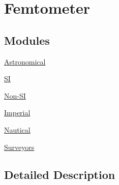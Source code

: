 \hypertarget{group___e_g_x_math-_conversions-_length_conversions-_s_i-_femtometer}{}\section{Femtometer}
\label{group___e_g_x_math-_conversions-_length_conversions-_s_i-_femtometer}
\subsection*{Modules}
\begin{DoxyCompactItemize}
\item 
\mbox{\hyperlink{group___e_g_x_math-_conversions-_length_conversions-_s_i-_femtometer-_astronomical}{Astronomical}}
\item 
\mbox{\hyperlink{group___e_g_x_math-_conversions-_length_conversions-_s_i-_femtometer-_s_i}{SI}}
\item 
\mbox{\hyperlink{group___e_g_x_math-_conversions-_length_conversions-_s_i-_femtometer-_non-_s_i}{Non-\/\+SI}}
\item 
\mbox{\hyperlink{group___e_g_x_math-_conversions-_length_conversions-_s_i-_femtometer-_imperial}{Imperial}}
\item 
\mbox{\hyperlink{group___e_g_x_math-_conversions-_length_conversions-_s_i-_femtometer-_nautical}{Nautical}}
\item 
\mbox{\hyperlink{group___e_g_x_math-_conversions-_length_conversions-_s_i-_femtometer-_surveyors}{Surveyors}}
\end{DoxyCompactItemize}


\subsection{Detailed Description}
